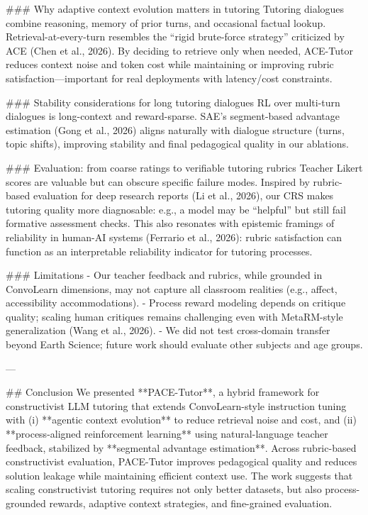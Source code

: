 ### Why adaptive context evolution matters in tutoring  
Tutoring dialogues combine reasoning, memory of prior turns, and occasional factual lookup. Retrieval-at-every-turn resembles the “rigid brute-force strategy” criticized by ACE (Chen et al., 2026). By deciding to retrieve only when needed, ACE-Tutor reduces context noise and token cost while maintaining or improving rubric satisfaction—important for real deployments with latency/cost constraints.

### Stability considerations for long tutoring dialogues  
RL over multi-turn dialogues is long-context and reward-sparse. SAE’s segment-based advantage estimation (Gong et al., 2026) aligns naturally with dialogue structure (turns, topic shifts), improving stability and final pedagogical quality in our ablations.

### Evaluation: from coarse ratings to verifiable tutoring rubrics  
Teacher Likert scores are valuable but can obscure specific failure modes. Inspired by rubric-based evaluation for deep research reports (Li et al., 2026), our CRS makes tutoring quality more diagnosable: e.g., a model may be “helpful” but still fail formative assessment checks. This also resonates with epistemic framings of reliability in human-AI systems (Ferrario et al., 2026): rubric satisfaction can function as an interpretable reliability indicator for tutoring processes.

### Limitations  
- Our teacher feedback and rubrics, while grounded in ConvoLearn dimensions, may not capture all classroom realities (e.g., affect, accessibility accommodations).  
- Process reward modeling depends on critique quality; scaling human critiques remains challenging even with MetaRM-style generalization (Wang et al., 2026).  
- We did not test cross-domain transfer beyond Earth Science; future work should evaluate other subjects and age groups.

---

## Conclusion  
We presented **PACE-Tutor**, a hybrid framework for constructivist LLM tutoring that extends ConvoLearn-style instruction tuning with (i) **agentic context evolution** to reduce retrieval noise and cost, and (ii) **process-aligned reinforcement learning** using natural-language teacher feedback, stabilized by **segmental advantage estimation**. Across rubric-based constructivist evaluation, PACE-Tutor improves pedagogical quality and reduces solution leakage while maintaining efficient context use. The work suggests that scaling constructivist tutoring requires not only better datasets, but also process-grounded rewards, adaptive context strategies, and fine-grained evaluation.

